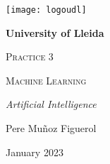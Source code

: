 \documentclass[11pt]{article}
\begin{document}
    \begin{titlepage}
        \centering
        {\texttt{[image: logoudl]}\par}
        \vspace{1cm}
        {\bfseries\LARGE University of Lleida \par}
        \vspace{3cm}
        {\scshape\Large Practice 3 \par}
        \vspace{1cm}
        {\scshape\Huge Machine Learning \par}
        \vspace{1cm}
        {\itshape\Large Artificial Intelligence \par}
        \vspace{5cm}
        {\Large Pere Muñoz Figuerol \par}
        \vfill
        {\Large January 2023 \par}
    \end{titlepage}
    \newpage

    \tableofcontents

    \newpage
\end{document}
